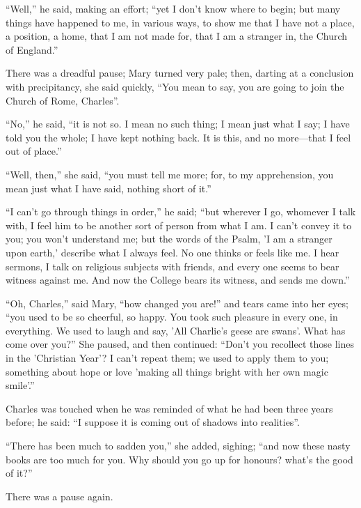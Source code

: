 ``Well,'' he said, making an effort; ``yet I don't know
where to begin; but many things have happened to me, in various ways,
to show me that I have not a place, a position, a home, that I am not
made for, that I am a stranger in, the Church of England.''

There was a dreadful pause; Mary turned very pale; then, darting at
a conclusion with precipitancy, she said quickly, ``You mean
to say, you are going to join the Church of Rome, Charles''.

``No,'' he said, ``it is not so. I mean no such thing;
I mean just what I say; I have told you the whole; I have kept nothing
back. It is this, and no more—that I feel out of place.''

``Well, then,'' she said, ``you must tell me more; for,
to my apprehension, you mean just what I have said, nothing short of
it.''

``I can't go through things in order,'' he said; ``but
wherever I go, whomever I talk with, I feel him to be another sort of
person from what I am. I can't convey it to you; you won't understand
me; but the words of the Psalm, 'I am a stranger upon earth,' describe
what I always feel. No one thinks or feels like me. I hear sermons, I
talk on religious subjects with friends, and every one seems to bear
witness against me. And now the College bears its witness, and sends
me down.''

``Oh, Charles,'' said Mary, ``how changed you
are!'' and tears came into her eyes; ``you used to be so
cheerful, so happy. You took such pleasure in every one, in
everything. We used to laugh and say, 'All Charlie's geese are swans'.
What has come over you?'' She paused, and then continued:
``Don't you recollect those lines in the 'Christian Year'? I can't
repeat them; we used to apply them to you; something about hope or
love 'making all things bright with her own magic smile'.''

Charles was touched when he was reminded of what he had been three
years before; he said: ``I suppose it is coming out of shadows
into realities''.

``There has been much to sadden you,'' she added, sighing;
``and now these nasty books are too much for you. Why should you
go up for honours? what's the good of it?''

There was a pause again.

